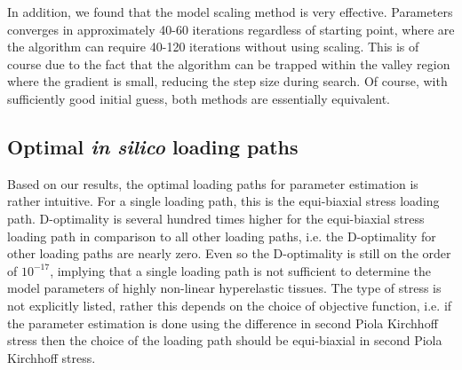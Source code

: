 	In addition, we found that the model scaling method is very effective. Parameters converges in approximately 40-60 iterations regardless of starting point, where are the algorithm can require 40-120 iterations without using scaling. This is of course due to the fact that the algorithm can be trapped within the valley region where the gradient is small, reducing the step size during search. Of course, with sufficiently good initial guess, both methods are essentially equivalent.



\subsection{Optimal \textit{in silico} loading paths}

	Based on our results, the optimal loading paths for parameter estimation is rather intuitive. For a single loading path, this is the equi-biaxial stress loading path. D-optimality is several hundred times higher for the equi-biaxial stress loading path in comparison to all other loading paths, i.e. the D-optimality for other loading paths are nearly zero. Even so the D-optimality is still on the order of $10^{-17}$, implying that a single loading path is not sufficient to determine the model parameters of highly non-linear hyperelastic tissues. The type of stress is not explicitly listed, rather this depends on the choice of objective function, i.e. if the parameter estimation is done using the difference in second Piola Kirchhoff stress then the choice of the loading path should be equi-biaxial in second Piola Kirchhoff stress. 
    
